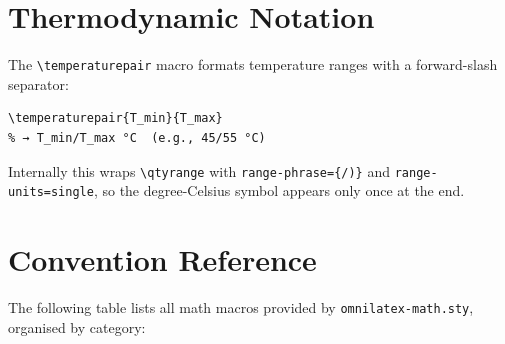 \section{Thermodynamic Notation}
\label{sec:temp-pair}

The \texttt{\textbackslash temperaturepair} macro formats temperature
ranges with a forward-slash separator:

\begin{verbatim}
\temperaturepair{T_min}{T_max}
% → T_min/T_max °C  (e.g., 45/55 °C)
\end{verbatim}

Internally this wraps \texttt{\textbackslash qtyrange} with
\texttt{range-phrase=\{/)\}} and \texttt{range-units=single}, so the
degree-Celsius symbol appears only once at the end.

\section{Convention Reference}

The following table lists all math macros provided by
\texttt{omnilatex-math.sty}, organised by category:

